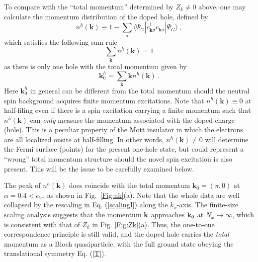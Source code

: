 \documentclass[aps,prb,twocolumn,notitlepage,superscriptaddress,showpacs]{revtex4-1}
\begin{document}
To compare with the ``total momentum'' determined by $Z_k\neq 0$ above, one may calculate the momentum distribution of the doped hole, defined by
\begin{equation}\label{nk}
n^h({\textbf{k}})\equiv 1-\sum_{\sigma}\langle \Psi_G|c^{\dagger}_{ \textbf{k} \sigma}c_{\textbf{k}\sigma}|\Psi_G \rangle ~,
\end{equation}
which satisfies the following sum rule
\begin{equation}\label{sumr}
\sum_{\textbf{k}} n^h({\textbf{k}})=1
\end{equation}
as there is only one hole with the total momentum given by
\begin{equation}\label{k0}
{\textbf{k}}_0^h=\sum_{\textbf{k}} {\textbf{k}} n^h({\textbf{k}})~.
\end{equation}
Here ${\textbf{k}}_0^h$ in general can be different from the total momentum should the neutral spin background acquires finite momentum excitations. Note that $n^h({\textbf{k}})\equiv 0$ at half-filing even if there is a spin excitation carrying a finite momentum such that $n^h({\textbf{k}})$ can \emph{only} measure the momentum associated with the doped charge (hole). This is a peculiar property of the Mott insulator in which the electrons are all localized onsite at half-filling. In other words, $n^h({\textbf{k}})\neq 0 $ will determine the Fermi surface (points) for the present one-hole state, but could represent a ``wrong'' total momentum structure should the novel spin excitation is also present. This will be the issue to be carefully examined below.

The peak of $n^h({\textbf{k}})$ does coincide with the total momentum ${\textbf{k}}_0=(\pi,0)$ at $\alpha=0.4<\alpha_c$, as shown in Fig.~\ref{Fig:nk}(a). Note that the whole data are well collapsed by the rescaling in Eq. (\ref{scalingI}) along the $k_x$-axis. The finite-size scaling analysis \cite{ZZ2013,ZZ2014qp,ZZ2014cm} suggests that the momentum ${\textbf k}$ approaches ${\textbf k}_0$ at $N_x\rightarrow \infty$, which is consistent with that of $Z_k$ in Fig. \ref{Fig:Zk}(a). Thus, the one-to-one correspondence principle is still valid, and the doped hole carries the \emph{total} momentum as a Bloch quasiparticle, with the full ground state obeying the translational symmetry Eq. (\ref{T}).
\end{document}
